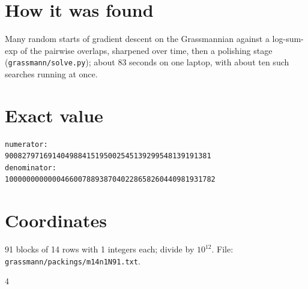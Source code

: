 \documentclass[11pt,a4paper]{article}
\begin{document}
\section{How it was found}
Many random starts of gradient descent on the Grassmannian against a log-sum-exp of the pairwise overlaps, sharpened over time, then a polishing stage (\texttt{grassmann/solve.py}); about 83 seconds on one laptop, with about ten such searches running at once.


\appendix
\section{Exact value}
{\small
\begin{verbatim}
numerator:
900827971691404988415195002545139299548139191381
denominator:
1000000000000466007889387040228658260440981931782
\end{verbatim}}

\section{Coordinates}
91 blocks of 14 rows with 1 integers each; divide by $10^{12}$. File: \texttt{grassmann/packings/m14n1N91.txt}.
{\tiny
\begin{multicols}{4}
\end{multicols}}
\end{document}
